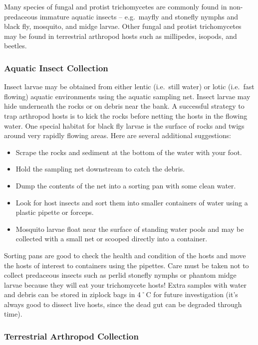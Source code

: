 \documentclass[]{book}
\providecommand{\tightlist}{%
  \setlength{\itemsep}{0pt}\setlength{\parskip}{0pt}}
\begin{document}
Many species of fungal and protist trichomycetes are commonly found in non-predaceous immature aquatic insects -- e.g.~mayfly and stonefly nymphs and black fly, mosquito, and midge larvae. Other fungal and protist trichomycetes may be found in terrestrial arthropod hosts such as millipedes, isopods, and beetles.

\hypertarget{aquatic-insect-collection}{%
\subsubsection{Aquatic Insect Collection}\label{aquatic-insect-collection}}

Insect larvae may be obtained from either lentic (i.e.~still water) or lotic (i.e.~fast flowing) aquatic environments using the aquatic sampling net. Insect larvae may hide underneath the rocks or on debris near the bank. A successful strategy to trap arthropod hosts is to kick the rocks before netting the hosts in the flowing water. One special habitat for black fly larvae is the surface of rocks and twigs around very rapidly flowing areas. Here are several additional suggestions:

\begin{itemize}
\tightlist
\item
  Scrape the rocks and sediment at the bottom of the water with your foot.
\item
  Hold the sampling net downstream to catch the debris.
\item
  Dump the contents of the net into a sorting pan with some clean water.
\item
  Look for host insects and sort them into smaller containers of water using a plastic pipette or forceps.
\item
  Mosquito larvae float near the surface of standing water pools and may be collected with a small net or scooped directly into a container.
\end{itemize}

Sorting pans are good to check the health and condition of the hosts and move the hosts of interest to containers using the pipettes. Care must be taken not to collect predaceous insects such as perlid stonefly nymphs or phantom midge larvae because they will eat your trichomycete hosts! Extra samples with water and debris can be stored in ziplock bags in 4˚C for future investigation (it's always good to dissect live hosts, since the dead gut can be degraded through time).

\hypertarget{terrestrial-arthropod-collection}{%
\subsubsection{Terrestrial Arthropod Collection}\label{terrestrial-arthropod-collection}}
\end{document}
